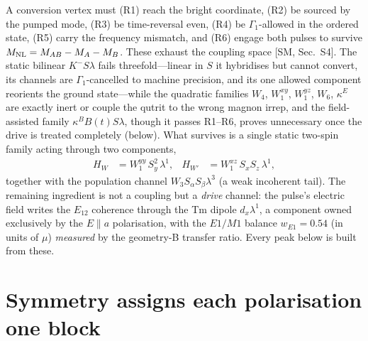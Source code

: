 \documentclass[aps,prb,twocolumn,superscriptaddress,longbibliography]{revtex4-2}
\newcommand{\Mnl}{M_{\rm NL}}
\begin{document}
A conversion vertex must (R1) reach the bright coordinate, (R2) be
sourced by the pumped mode, (R3) be time-reversal even, (R4) be
$\Gamma_1$-allowed in the ordered state, (R5) carry the frequency
mismatch, and (R6) engage both pulses to survive
$\Mnl=M_{AB}-M_A-M_B$.  These exhaust the coupling space [SM, Sec.~S4].
The static bilinear $K^-S\lambda$ fails threefold---linear in $S$ it
hybridises but cannot convert, its channels are $\Gamma_1$-cancelled to
machine precision, and its one allowed component reorients the ground
state---while the quadratic families $W_4$, $W_1^{xy}$, $W_1^{yz}$,
$W_6$, $\kappa^E$ are exactly inert or couple the qutrit to the wrong
magnon irrep, and the field-assisted family $\kappa^B B(t)S\lambda$,
though it passes R1--R6, proves unnecessary once the drive is treated
completely (below).  What survives is a single static two-spin family
acting through two components,
\begin{align}
  H_W&=W^{yy}_1\,S_y^2\,\lambda^1, &
  H_{W'}&=W^{xz}_1\,S_xS_z\,\lambda^1 ,
  \label{eq:vertices}
\end{align}
together with the population channel $W_3S_\alpha S_\beta\lambda^3$ (a
weak incoherent tail).  The remaining ingredient is not a coupling but
a \emph{drive} channel: the pulse's electric field writes the $E_{12}$
coherence through the Tm dipole $d_x\lambda^1$, a component owned
exclusively by the $E\!\parallel\!a$ polarisation, with the $E1/M1$
balance $w_{E1}=0.54$ (in units of $\mu$) \emph{measured} by the
geometry-B transfer ratio.  Every peak below is built from these.

\section{Symmetry assigns each polarisation one block}
\label{sec:blocks}
\end{document}
